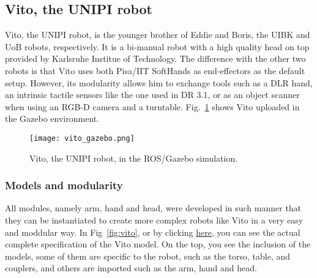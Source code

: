 \subsection{Vito, the UNIPI robot}
\label{sec:vito}

Vito, the UNIPI robot, is the younger brother of Eddie and Boris, the UIBK and UoB robots, respectively. It is a bi-manual robot with a high quality head on top provided by Karlsruhe Institue of Technology. The difference with the other two robots is that Vito uses both Pisa/IIT SoftHands as end-effectors as the default setup. However, its modularity allows him to exchange tools such as a DLR hand, an intrinsic tactile sensors like the one used in DR 3.1, or as an object scanner when using an RGB-D camera and a turntable. Fig.~\ref{fig:vito_gazebo} shows Vito uploaded in the Gazebo environment.

\begin{figure}
\centering
\texttt{[image: vito\_gazebo.png]}
\caption{Vito, the UNIPI robot, in the ROS/Gazebo simulation.}
\label{fig:vito_gazebo}
\end{figure}

\subsubsection{Models and modularity}

All modules, namely arm, hand and head, were developed in such manner that they can be instantiated to create more complex robots like Vito in a very easy and moddular way. In Fig~\ref{fig:vito}, or by clicking \href{https://github.com/CentroEPiaggio/vito_robot/blob/master/vito_description/robot/vito.urdf.xacro}{here}, you can see the actual complete specification of the Vito model. On the top, you see the inclusion of the models, some of them are specific to the robot, such as the torso, table, and couplers, and others are imported such as the arm, hand and head.

